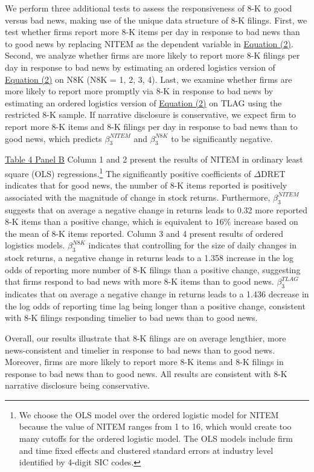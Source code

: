 \documentclass[letterpaper,12pt]{article}
\begin{document}
\begin{spacing}{1.5}
We perform three additional tests to assess the responsiveness of 8-K to good versus bad news, making use of the unique data structure of 8-K filings. First, we test whether firms report more 8-K items per day in response to bad news than to good news by replacing NITEM as the dependent variable in \hyperref[eq2]{Equation (2)}. Second, we analyze whether firms are more likely to report more 8-K filings per day in response to bad news by estimating an ordered logistics version of \hyperref[eq2]{Equation (2)} on N8K (N8K = 1, 2, 3, 4). Last, we examine whether firms are more likely to report more promptly via 8-K in response to bad news by estimating an ordered logistics version of \hyperref[eq2]{Equation (2)} on TLAG using the restricted 8-K sample. If narrative disclosure is conservative, we expect firm to report more 8-K items and 8-K filings per day in response to bad news than to good news, which predicts $\beta_3^{NITEM}$ and $\beta_3^{N8K}$ to be significantly negative.

\hyperref[T4PB]{Table 4 Panel B} Column 1 and 2 present the results of NITEM in ordinary least square (OLS) regressions.\footnote{We choose the OLS model over the ordered logistic model for NITEM because the value of NITEM ranges from 1 to 16, which would create too many cutoffs for the ordered logistic model. The OLS models include firm and time fixed effects and clustered standard errors at industry level identified by 4-digit SIC codes. } The significantly positive coefficients of $\Delta$DRET indicates that for good news, the number of 8-K items reported is positively associated with the magnitude of change in stock returns. Furthermore, $\beta_3^{NITEM}$ suggests that on average a negative change in returns leads to 0.32 more reported 8-K items than a positive change, which is equivalent to 16\% increase based on the mean of 8-K items reported. Column 3 and 4 present results of ordered logistics models. $\beta_3^{N8K}$ indicates that controlling for the size of daily changes in stock returns, a negative change in returns leads to a 1.358 increase in the log odds of reporting more number of 8-K filings than a positive change, suggesting that firms respond to bad news with more 8-K items than to good news. $\beta_3^{TLAG}$ indicates that on average a negative change in returns leads to a 1.436 decrease in the log odds of reporting time lag being longer than a positive change, consistent with 8-K filings responding timelier to bad news than to good news. 

Overall, our results illustrate that 8-K filings are on average lengthier, more news-consistent and timelier in response to bad news than to good news. Moreover, firms are more likely to report more 8-K items and 8-K filings in response to bad news than to good news. All results are consistent with 8-K narrative disclosure being conservative.


\end{spacing}
\end{document}
